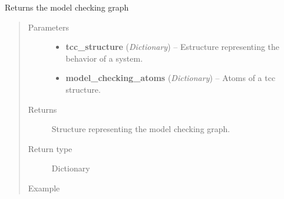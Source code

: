 \documentclass[letterpaper,10pt,english]{sphinxmanual}
\begin{document}
\begin{fulllineitems}
\label{modelCheckingGraph:modelCheckingGraph.getModelCheckingGraph}
Returns the model checking graph
\begin{quote}\begin{description}
\item[{Parameters}] \leavevmode\begin{itemize}
\item {} 
\textbf{tcc\_structure} (\emph{Dictionary}) -- Estructure representing the behavior of a system.

\item {} 
\textbf{model\_checking\_atoms} (\emph{Dictionary}) -- Atoms of a tcc structure.

\end{itemize}

\item[{Returns}] \leavevmode
Structure representing the model checking graph.

\item[{Return type}] \leavevmode
Dictionary

\item[{Example }] \leavevmode
\end{description}\end{quote}


\end{fulllineitems}
\end{document}
